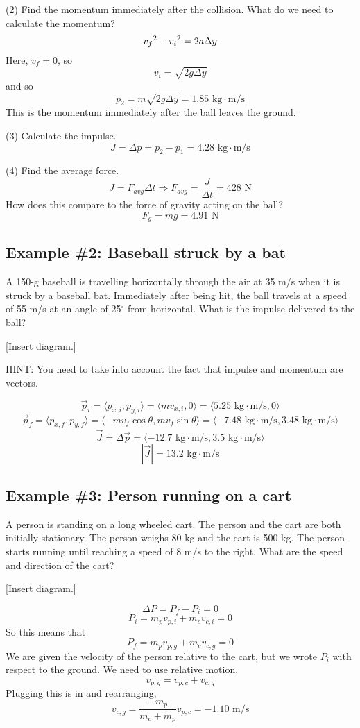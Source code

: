 (2) Find the momentum immediately after the collision. What do we need to calculate the momentum?
$$v_f\displaystyle^2-v_i\displaystyle^2=2a\Delta{y}$$
Here, $v_f=0$, so
$$v_i=\sqrt{2g\Delta{y}}$$
and so
$$p_2=m\sqrt{2g\Delta{y}}=1.85\mbox{ kg}\cdot\mbox{m/s}$$
This is the momentum immediately after the ball leaves the ground.

(3) Calculate the impulse.
$$J=\Delta{p}=p_2-p_1=4.28\mbox{ kg}\cdot\mbox{m/s}$$

(4) Find the average force.
$$J=F_{avg}\Delta{t}\Rightarrow F_{avg}=\frac{J}{\Delta{t}}=428\mbox{ N}$$
How does this compare to the force of gravity acting on the ball?
$$F_g=mg=4.91\mbox{ N}$$

\subsection{Example \#2: Baseball struck by a bat}
A 150-g baseball is travelling horizontally through the air at 35 m/s when it is struck by a baseball bat. Immediately after being hit, the ball travels at a speed of 55 m/s at an angle of 25$^\circ$ from horizontal. What is the impulse delivered to the ball?

[Insert diagram.]\nopagebreak
\vspace{4cm}

HINT: You need to take into account the fact that impulse and momentum are vectors.

$$\vec{p}_i=\langle{p_{x,i},p_{y,i}}\rangle=\langle{mv_{x,i},0}\rangle=\langle{5.25\mbox{ kg}\cdot\mbox{m/s},0}\rangle$$
$$\vec{p}_f=\langle{p_{x,f},p_{y,f}}\rangle=\langle{-mv_f\cos\theta,mv_f\sin\theta}\rangle=\langle{-7.48\mbox{ kg}\cdot\mbox{m/s},3.48\mbox{ kg}\cdot\mbox{m/s}}\rangle$$
$$\vec{J}=\Delta{\vec{p}}=\langle{-12.7\mbox{ kg}\cdot\mbox{m/s},3.5\mbox{ kg}\cdot\mbox{m/s}}\rangle$$
$$|\vec{J}|=13.2\mbox{ kg}\cdot\mbox{m/s}$$

\subsection{Example \#3: Person running on a cart}
A person is standing on a long wheeled cart.  The person and the cart are both initially stationary. The person weighs 80 kg and the cart is 500 kg. The person starts running until reaching a speed of 8 m/s to the right. What are the speed and direction of the cart?

[Insert diagram.]\nopagebreak
\vspace{4cm}

$$\Delta{P}=P_f-P_i=0$$
$$P_i=m_pv_{p,i}+m_cv_{c,i}=0$$
So this means that
$$P_f=m_pv_{p,g}+m_cv_{c,g}=0$$
We are given the velocity of the person relative to the cart, but we wrote $P_i$ with respect to the ground. We need to use relative motion.
$$v_{p,g}=v_{p,c}+v_{c,g}$$
Plugging this is in and rearranging,
$$v_{c,g} = \frac{-m_p}{m_c+m_p}v_{p,c}=-1.10\mbox{ m/s}$$

